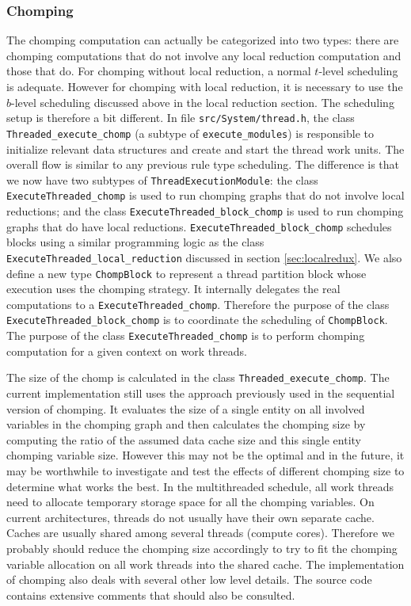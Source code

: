 \documentclass{article}
\begin{document}
\subsubsection{Chomping}
\label{sec:chomp}
The chomping computation can actually be categorized into two types:
there are chomping computations that do not involve any local reduction
computation and those that do.  For chomping without local reduction, a
normal $t$-level scheduling is adequate.  However for chomping with
local reduction, it is necessary to use the $b$-level scheduling
discussed above in the local reduction section.  The scheduling setup is
therefore a bit different.  In file \texttt{src/System/thread.h}, the
class \lstinline{Threaded_execute_chomp} (a subtype of
\lstinline{execute_modules}) is responsible to initialize relevant data
structures and create and start the thread work units.  The overall flow
is similar to any previous rule type scheduling.  The difference is that
we now have two subtypes of \lstinline{ThreadExecutionModule}: the class
\lstinline{ExecuteThreaded_chomp} is used to run chomping graphs that do
not involve local reductions; and the class
\lstinline{ExecuteThreaded_block_chomp} is used to run chomping graphs
that do have local reductions.  \lstinline{ExecuteThreaded_block_chomp}
schedules blocks using a similar programming logic as the class
\lstinline{ExecuteThreaded_local_reduction} discussed in section
\ref{sec:localredux}.  We also define a new type \lstinline{ChompBlock}
to represent a thread partition block whose execution uses the chomping
strategy.  It internally delegates the real computations to a
\lstinline{ExecuteThreaded_chomp}.  Therefore the purpose of the class
\lstinline{ExecuteThreaded_block_chomp} is to coordinate the scheduling
of \lstinline{ChompBlock}.  The purpose of the class
\lstinline{ExecuteThreaded_chomp} is to perform chomping computation for
a given context on work threads.

The size of the chomp is calculated in the class
\lstinline{Threaded_execute_chomp}.  The current implementation still
uses the approach previously used in the sequential version of chomping.
It evaluates the size of a single entity on all involved variables in
the chomping graph and then calculates the chomping size by computing
the ratio of the assumed data cache size and this single entity chomping
variable size.  However this may not be the optimal and in the future,
it may be worthwhile to investigate and test the effects of different
chomping size to determine what works the best.  In the multithreaded
schedule, all work threads need to allocate temporary storage space for
all the chomping variables.  On current architectures, threads do not
usually have their own separate cache.  Caches are usually shared among
several threads (compute cores).  Therefore we probably should reduce
the chomping size accordingly to try to fit the chomping variable
allocation on all work threads into the shared cache.  The
implementation of chomping also deals with several other low level
details.  The source code contains extensive comments that should also
be consulted.
\end{document}
